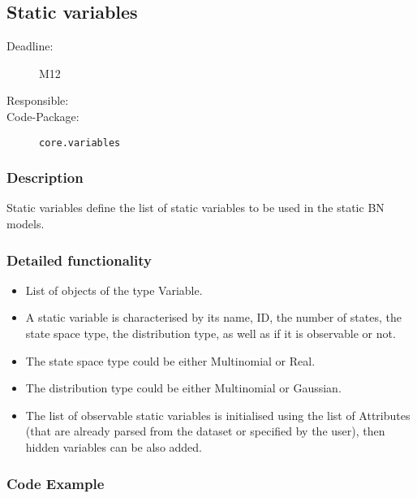 \newpage
\subsection{Static variables}
\label{Functionality:ID}

\begin{description}
\item[Deadline:] M12
\item[Responsible:]
\item[Code-Package:] \texttt{core.variables}
\end{description}

\subsubsection*{Description}

Static variables define the list of static variables to be used in the static BN models.  

\subsubsection*{Detailed functionality}

\begin{itemize}
\item List of objects of the type Variable. 

\item A static variable is characterised by its name, ID, the number of states, the state space type, the distribution type, as well as if it is observable or not.

\item The state space type could be either Multinomial or Real.

\item The distribution type could be either Multinomial or Gaussian.

\item The list of observable static variables is initialised using the list of Attributes (that are already parsed from the dataset or specified by the user), then hidden variables can be also added.

\end{itemize}

\subsubsection*{Code Example}

